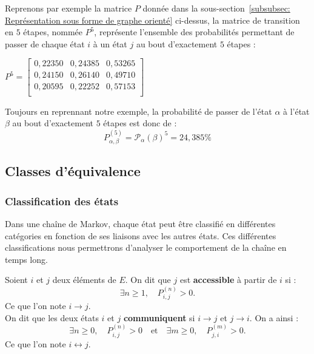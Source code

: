 \documentclass{article}
\begin{document}
\begin{tcolorbox}[colback=white,colframe=yellow!80!black,title=Exemple, breakable]
Reprenons par exemple la matrice $P$ donnée dans la sous-section~\ref{subsubsec: Représentation sous forme de graphe orienté} ci-dessus, la matrice de transition en $5$ étapes, nommée $P^{5}$, représente l'ensemble des probabilités permettant de passer de chaque état $i$ à un état $j$ au bout d'exactement $5$ étapes :
\begin{center}
$
P^{5} = \begin{bmatrix}
0,22350 & 0,24385 & 0,53265 \\
0,24150 & 0,26140 & 0,49710 \\
0,20595 & 0,22252 & 0,57153 \\
\end{bmatrix}
$
\end{center}
Toujours en reprennant notre exemple, la probabilité de passer de l'état $\alpha$ à l'état $\beta$ au bout d'exactement $5$ étapes est donc de :
\[
P_{\alpha,\beta}^{(5)} = \mathcal{P}_\alpha(\beta)^{5} = 24,385\%
\]
\end{tcolorbox}

\newpage
\subsection{Classes d'équivalence}

\subsubsection{Classification des états}
\label{subsubsec: Les différents types d'états}

Dans une chaîne de Markov, chaque état peut être classifié en différentes catégories en fonction de ses liaisons avec les autres états. Ces différentes classifications nous permettrons d'analyser le comportement de la chaîne en temps long.

\begin{tcolorbox}[colback=white,colframe=red!80!black,title=Accessibilité et communication]
Soient $i$ et $j$ deux éléments de $E$. On dit que $j$ est \textbf{accessible} à partir de $i$ si :
\[
\exists n \geq 1, \quad P_{i,j}^{(n)} > 0.
\]
Ce que l'on note $i \to j$. \\

On dit que les deux états $i$ et $j$ \textbf{communiquent} si $i \rightarrow j$ et $j \rightarrow i$. On a ainsi :
\[
\exists n \geq 0, \quad P_{i,j}^{(n)} > 0 \quad \text{et} \quad \exists m \geq 0, \quad P_{j,i}^{(m)} > 0.
\]
Ce que l'on note $i \leftrightarrow j$.
\end{tcolorbox}
\end{document}
